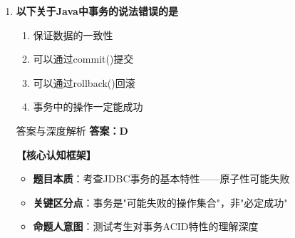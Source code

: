 \documentclass[12pt, a4paper]{ctexart}
\begin{document}
\begin{enumerate}[label=\textbf{\arabic*.}]
\begin{bluebox}{答案与深度解析}
\begin{enumerate}[label={}, leftmargin=*, nosep]
			      \item \textbf{必考结论}：开发中应优先使用PreparedStatement
		      \end{enumerate}

		      \textbf{【命题趋势与实战策略】}

		      \textbf{考场秒杀技巧}：PreparedStatement三个核心优势——防注入、提性能、参数化
	      \end{bluebox}

	\item \textbf{以下关于Java中事务的说法错误的是}
	      \begin{enumerate}[label=\Alph*.]
		      \item 保证数据的一致性
		      \item 可以通过commit()提交
		      \item 可以通过rollback()回滚
		      \item 事务中的操作一定能成功
	      \end{enumerate}

	      \begin{bluebox}{答案与深度解析}
		      \textbf{答案：D}

		      \textbf{【核心认知框架】}
		      \begin{itemize}[label={}, leftmargin=*, nosep]
			      \item \textbf{题目本质}：考查JDBC事务的基本特性——原子性可能失败
			      \item \textbf{关键区分点}：事务是"可能失败的操作集合"，非"必定成功"
			      \item \textbf{命题人意图}：测试考生对事务ACID特性的理解深度
		      \end{itemize}


\end{bluebox}
\end{enumerate}
\end{document}
